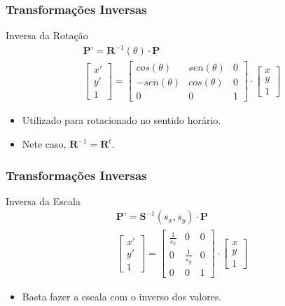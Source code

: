 \documentclass{beamer}
\begin{document}

\begin{frame}
\frametitle{Transformações Inversas}
	\begin{block}{Inversa da Rotação}
		\begin{eqnarray*}
			\textbf{P'} = \textbf{R}^{-1}(\theta) \cdot \textbf{P} \\
			\begin{bmatrix} 
					x' \\
					y' \\
					1
			\end{bmatrix}
			=	\begin{bmatrix}
					cos(\theta)	& sen (\theta) 	& 0 \\
					-sen(\theta)	& cos (\theta) 	& 0 \\
					0	& 0	& 1
					\end{bmatrix}
			\cdot \begin{bmatrix}
					x \\
					y \\
					1
				\end{bmatrix}
		\end{eqnarray*}
		\begin{itemize}
			\item Utilizado para rotacionado no sentido horário.
			\item Nete caso, $\textbf{R}^{-1} = \textbf{R}^t$.
		\end{itemize}
	\end{block}
\end{frame}



\begin{frame}
\frametitle{Transformações Inversas}
	\begin{block}{Inversa da Escala}
		\begin{eqnarray*}
			\textbf{P'} = \textbf{S}^{-1}(s_x,s_y) \cdot \textbf{P} \\
			\begin{bmatrix} 
					x' \\
					y' \\
					1
			\end{bmatrix}
			=	\begin{bmatrix}
					\frac{1}{s_x}	& 0 	& 0 \\
					0	& \frac{1}{s_y} 	& 0 \\
					0	& 0	& 1
					\end{bmatrix}
			\cdot \begin{bmatrix}
					x \\
					y \\
					1
				\end{bmatrix}
		\end{eqnarray*}
		\begin{itemize}
			\item Basta fazer a escala com o inverso dos valores.
		\end{itemize}
	\end{block}
\end{frame}
\end{document}

